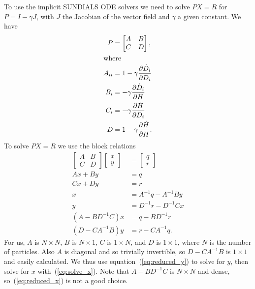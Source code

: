 \documentclass{article}
\begin{document}
\newpage

To use the implicit SUNDIALS ODE solvers we need to solve $P X = R$
for $P = I - \gamma J$, with $J$ the Jacobian of the vector field and
$\gamma$ a given constant. We have
\begin{align}
  P &= \begin{bmatrix} A & B \\ C & D \end{bmatrix}, \\
\intertext{where}
  A_{ii} &= 1 - \gamma \frac{\partial \dot{D}_i}{\partial D_i} \\
  B_i &= - \gamma \frac{\partial \dot{D}_i}{\partial H} \\
  C_i &= - \gamma \frac{\partial \dot{H}}{\partial D_i} \\
  D &= 1 - \gamma \frac{\partial \dot{H}}{\partial H}.
\end{align}
To solve $P X = R$ we use the block relations
\begin{align}
  \begin{bmatrix} A & B \\ C & D \end{bmatrix}
  \begin{bmatrix} x \\ y \end{bmatrix}
  &=
  \begin{bmatrix} q \\ r \end{bmatrix} \\
  A x + B y &= q \\
  C x + D y &= r \\
  x &= A^{-1} q - A^{-1} B y \label{eq:solve_x} \\
  y &= D^{-1} r - D^{-1} C x \label{eq:solve_y} \\
  (A - B D^{-1} C) x &= q - B D^{-1} r \label{eq:reduced_x} \\
  (D - C A^{-1} B) y &= r - C A^{-1} q. \label{eq:reduced_y}
\end{align}
For us, $A$ is $N \times N$, $B$ is $N \times 1$, $C$ is $1 \times N$,
and $D$ is $1 \times 1$, where $N$ is the number of particles. Also
$A$ is diagonal and so trivially invertible, so $D - C A^{-1} B$ is $1
\times 1$ and easily calculated. We thus use
equation~(\ref{eq:reduced_y}) to solve for $y$, then solve for $x$
with~(\ref{eq:solve_x}). Note that $A - B D^{-1} C$ is $N \times N$
and dense, so~(\ref{eq:reduced_x}) is not a good choice.
\end{document}
